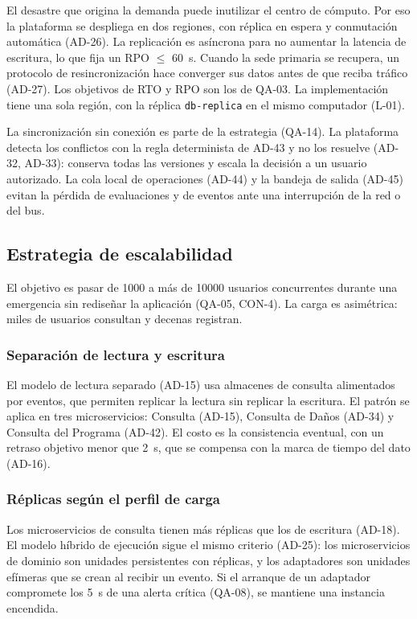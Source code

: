 \documentclass[11pt,letterpaper]{article}
\begin{document}
El desastre que origina la demanda puede inutilizar el centro de cómputo.
Por eso la plataforma se despliega en dos regiones, con réplica en espera y conmutación
automática (AD-26). La replicación es asíncrona para no aumentar la latencia de escritura,
lo que fija un RPO $\le$ \qty{60}{\second}. Cuando la sede primaria se recupera, un
protocolo de resincronización hace converger sus datos antes de que reciba tráfico
(AD-27). Los objetivos de RTO y RPO son los de QA-03. La implementación tiene una sola región, con
la réplica \texttt{db-replica} en el mismo computador (L-01).

La sincronización sin conexión es parte de la estrategia (QA-14). La plataforma detecta los
conflictos con la regla determinista de AD-43 y no los resuelve (AD-32, AD-33): conserva todas las
versiones y escala la decisión a un usuario autorizado. La cola local de operaciones (AD-44) y la
bandeja de salida (AD-45) evitan la pérdida de evaluaciones y de eventos ante una interrupción de
la red o del bus.

\subsection{Estrategia de escalabilidad}
\label{sec:est-escalabilidad}

El objetivo es pasar de \num{1000} a más de \num{10000} usuarios concurrentes durante una
emergencia sin rediseñar la aplicación (QA-05, CON-4). La carga es asimétrica: miles de usuarios
consultan y decenas registran.

\subsubsection*{Separación de lectura y escritura}

El modelo de lectura separado (AD-15) usa almacenes de
consulta alimentados por eventos, que permiten replicar la lectura sin replicar la
escritura. El patrón se aplica en tres microservicios: Consulta (AD-15), Consulta de Daños
(AD-34) y Consulta del Programa (AD-42). El costo es la consistencia eventual, con un
retraso objetivo menor que \qty{2}{\second}, que se compensa con la marca de tiempo del
dato (AD-16).
\subsubsection*{Réplicas según el perfil de carga}

Los microservicios de consulta tienen más réplicas que
los de escritura (AD-18). El modelo híbrido de ejecución sigue el mismo criterio (AD-25):
los microservicios de dominio son unidades persistentes con réplicas, y los adaptadores son
unidades efímeras que se crean al recibir un evento. Si el arranque de un adaptador
compromete los \qty{5}{\second} de una alerta crítica (QA-08), se mantiene una instancia
encendida.
\end{document}
